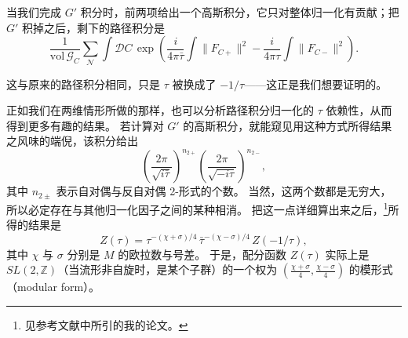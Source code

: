 当我们完成 $G'$ 积分时，前两项给出一个高斯积分，它只对整体归一化有贡献；把 $G'$ 积掉之后，剩下的路径积分是
\begin{equation}
  \tag{8.70}
  \label{eq:8-70}
  \frac{1}{\mathrm{vol}\,\mathcal{G}_{C}}\sum_{\mathcal{N}}\int\mathcal{D}C\,\exp\left(\frac{i}{4\pi\bar\tau}\int\|F_{C+}\|^{2}-\frac{i}{4\pi\tau}\int\|F_{C-}\|^{2}\right).
\end{equation}

这与原来的路径积分相同，只是 $\tau$ 被换成了 $-1/\tau$——这正是我们想要证明的。


正如我们在两维情形所做的那样，也可以分析路径积分归一化的 $\tau$ 依赖性，从而得到更多有趣的结果。
若计算对 $G'$ 的高斯积分，就能窥见用这种方式所得结果之风味的端倪，该积分给出
\begin{equation}
  \tag{8.71}
  \label{eq:8-71}
  \left(\frac{2\pi}{\sqrt{i\bar\tau}}\right)^{n_{2+}}\left(\frac{2\pi}{\sqrt{-i\tau}}\right)^{n_{2-}},
\end{equation}
其中 $n_{2\pm}$ 表示自对偶与反自对偶 2-形式的个数。
当然，这两个数都是无穷大，所以必定存在与其他归一化因子之间的某种相消。
把这一点详细算出来之后，\footnote{见参考文献中所引的我的论文。}所得的结果是
\begin{equation}
  \tag{8.72}
  \label{eq:8-72}
  Z(\tau)=\tau^{-(\chi+\sigma)/4}\,\bar\tau^{-(\chi-\sigma)/4}\,Z(-1/\tau),
\end{equation}
其中 $\chi$ 与 $\sigma$ 分别是 $M$ 的欧拉数与号差。
于是，配分函数 $Z(\tau)$ 实际上是 $SL(2,\mathbb{Z})$（当流形非自旋时，是某个子群）的一个权为 $\left(\frac{\chi+\sigma}{4},\frac{\chi-\sigma}{4}\right)$ 的模形式（modular form）。

